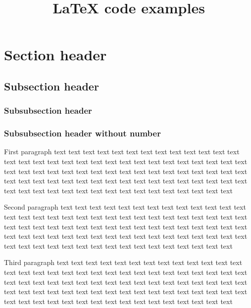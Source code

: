 \documentclass[twocolumn, 10pt, a4paper]{article}
\begin{document}
\title{\vspace{-1.4cm} \huge{LaTeX code examples}}
\author{}
\date{}

\twocolumn[\begin{@twocolumnfalse} \maketitle \end{@twocolumnfalse}]

	


\section{Section header}

\subsection{Subsection header}
\label{sec: header 1}

\subsubsection{Subsubsection header}

\subsubsection*{Subsubsection header without number}

First paragraph 
text text text text text text text text text text text text text text text text 
text text text text text text text text text text text text text text text text
text text text text text text text text text text text text text text text text
text text text text text text text text text text text text text text text text
text text text text text text text text text text text text text text text text

Second paragraph 
text text text text text text text text text text text text text text text text 
text text text text text text text text text text text text text text text text
text text text text text text text text text text text text text text text text
text text text text text text text text text text text text text text text text
text text text text text text text text text text text text text text text text

Third paragraph
text text text text text text text text text text text text text text text text 
text text text text text text text text text text text text text text text text
text text text text text text text text text text text text text text text text
text text text text text text text text text text text text text text text text
text text text text text text text text text text text text text text text text
\end{document}
